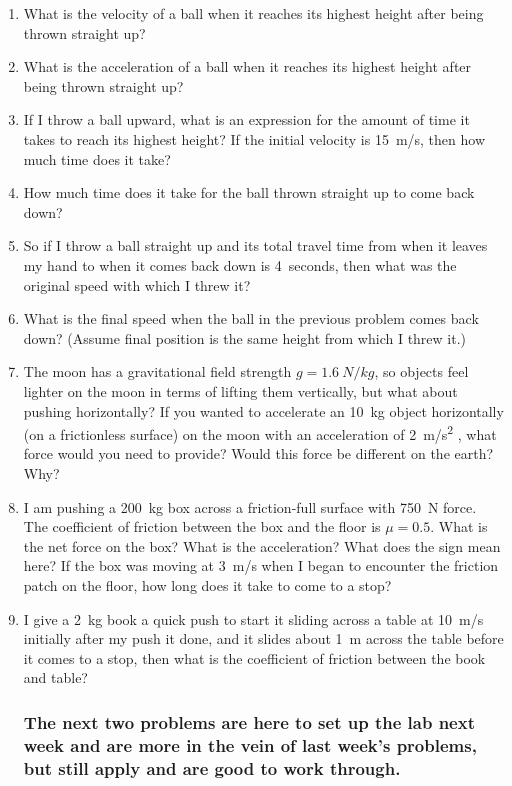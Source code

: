 \begin{enumerate}
\item What is the velocity of a ball when it reaches its highest height after being thrown straight up?
\item What is the acceleration of a ball when it reaches its highest height after being thrown straight up?
\item If I throw a ball upward, what is an expression for the amount of time it takes to reach its highest height? If the initial velocity is \SI{15}{m/s}, then how much time does it take? 
\item How much time does it take for the ball thrown straight up to come back down?
\item So if I throw a ball straight up and its total travel time from when it leaves my hand to when it comes back down is \SI{4}{seconds}, then what was the original speed with which I threw it?
\item What is the final speed when the ball in the previous problem comes back down? (Assume final position is the same height from which I threw it.)




\item The moon has a gravitational field strength $g=\SI{1.6}{N/kg}$, so objects feel lighter on the moon in terms of lifting them vertically, but what about pushing horizontally? If you wanted to accelerate an \SI{10}{kg} object horizontally (on a frictionless surface) on the moon with an acceleration of \SI{2}{\meter/\second^2} , what force would you need to provide? Would this force be different on the earth? Why?

\item I am pushing a \SI{200}{\kilogram} box across a friction-full surface with \SI{750}{\newton} force. The coefficient of friction between the box and the floor is $\mu=0.5$. What is the net force on the box? What is the acceleration? What does the sign mean here? If the box was moving at \SI{3}{m/s} when I began to encounter the friction patch on the floor, how long does it take to come to a stop?\bigskip

\item I give a \SI{2}{kg} book a quick push to start it sliding across a table at \SI{10}{m/s} initially after my push it done, and it slides about \SI{1}{m} across the table before it comes to a stop, then what is the coefficient of friction between the book and table?\bigskip

\subsubsection*{The next two problems are here to set up the lab next week and are more in the vein of last week's problems, but still apply and are good to work through.}\vspace{-1in}


\end{enumerate}
